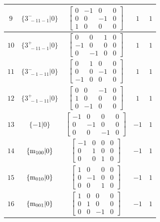 \documentclass[fleqn,8pt]{jsarticle}
\begin{document}
\begin{longtable}{ccccc}
$ 9 $ & $ \{3^{-}_{\,\,-11-1}|0\} $ & $ \begin{bmatrix} 0 & -1 & 0 & 0 \\ 0 & 0 & -1 & 0 \\ 1 & 0 & 0 & 0 \end{bmatrix} $ & $ 1 $ & $ 1 $ \\ \hline
$ 10 $ & $ \{3^{+}_{\,\,-11-1}|0\} $ & $ \begin{bmatrix} 0 & 0 & 1 & 0 \\ -1 & 0 & 0 & 0 \\ 0 & -1 & 0 & 0 \end{bmatrix} $ & $ 1 $ & $ 1 $ \\ \hline
$ 11 $ & $ \{3^{-}_{\,\,-1-11}|0\} $ & $ \begin{bmatrix} 0 & 1 & 0 & 0 \\ 0 & 0 & -1 & 0 \\ -1 & 0 & 0 & 0 \end{bmatrix} $ & $ 1 $ & $ 1 $ \\ \hline
$ 12 $ & $ \{3^{+}_{\,\,-1-11}|0\} $ & $ \begin{bmatrix} 0 & 0 & -1 & 0 \\ 1 & 0 & 0 & 0 \\ 0 & -1 & 0 & 0 \end{bmatrix} $ & $ 1 $ & $ 1 $ \\ \hline
$ 13 $ & $ \{-1|0\} $ & $ \begin{bmatrix} -1 & 0 & 0 & 0 \\ 0 & -1 & 0 & 0 \\ 0 & 0 & -1 & 0 \end{bmatrix} $ & $ -1 $ & $ 1 $ \\ \hline
$ 14 $ & $ \{{\rm m}_{100}|0\} $ & $ \begin{bmatrix} -1 & 0 & 0 & 0 \\ 0 & 1 & 0 & 0 \\ 0 & 0 & 1 & 0 \end{bmatrix} $ & $ -1 $ & $ 1 $ \\ \hline
$ 15 $ & $ \{{\rm m}_{010}|0\} $ & $ \begin{bmatrix} 1 & 0 & 0 & 0 \\ 0 & -1 & 0 & 0 \\ 0 & 0 & 1 & 0 \end{bmatrix} $ & $ -1 $ & $ 1 $ \\ \hline
$ 16 $ & $ \{{\rm m}_{001}|0\} $ & $ \begin{bmatrix} 1 & 0 & 0 & 0 \\ 0 & 1 & 0 & 0 \\ 0 & 0 & -1 & 0 \end{bmatrix} $ & $ -1 $ & $ 1 $ \\ \hline

\end{longtable}
\end{document}

